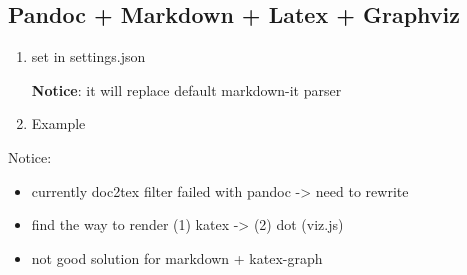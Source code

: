 \hypertarget{pandoc-markdown-latex-graphviz}{%
\subsection{Pandoc + Markdown + Latex +
Graphviz}\label{pandoc-markdown-latex-graphviz}}

\begin{enumerate}
\def\labelenumi{\arabic{enumi}.}
\item
  set in settings.json

\begin{Shaded}
\begin{Highlighting}[]
 
\end{Highlighting}
\end{Shaded}

  \textbf{Notice}: it will replace default markdown-it parser
\item
  Example
\end{enumerate}

\begin{Shaded}
\begin{Highlighting}[]
 \OtherTok{\{}
\CommentTok{  }\OtherTok{=}
\CommentTok{  }\OtherTok{=}

\CommentTok{  }\CommentTok{ }\OtherTok{[}\OtherTok{=}\OtherTok{]}
\CommentTok{  }\CommentTok{ }\OtherTok{->}\CommentTok{ }\CommentTok{ }\OtherTok{->}\CommentTok{ }\OtherTok{;}
\CommentTok{  }\CommentTok{ }\OtherTok{->}\CommentTok{ }\OtherTok{;}
\OtherTok{\}}
\end{Highlighting}
\end{Shaded}

Notice:

\begin{itemize}
\tightlist
\item
  currently doc2tex filter failed with pandoc -\textgreater{} need to
  rewrite
\item
  find the way to render (1) katex -\textgreater{} (2) dot (viz.js)
\item
  not good solution for markdown + katex-graph
\end{itemize}
